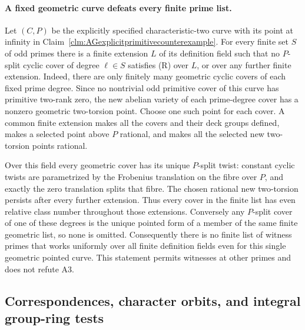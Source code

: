 \documentclass[11pt]{article}
\begin{document}
\paragraph{A fixed geometric curve defeats every finite prime list.}
Let $(C,P)$ be the explicitly specified characteristic-two
curve with its point at infinity in
Claim~\ref{clm:AGexplicitprimitivecounterexample}.
For every finite set $S$ of odd primes there is a finite
extension $L$ of its definition field such that no
$P$-split cyclic cover of degree $\ell\in S$ satisfies
(R) over $L$, or over any further finite extension.
Indeed, there are only finitely many geometric cyclic
covers of each fixed prime degree. Since no nontrivial
odd primitive cover of this curve has primitive two-rank
zero, the new abelian variety of each prime-degree cover
has a nonzero geometric two-torsion point. Choose one
such point for each cover. A common finite extension
makes all the covers and their deck groups defined,
makes a selected point above $P$ rational, and makes
all the selected new two-torsion points rational.

Over this field every geometric cover has its unique
$P$-split twist: constant cyclic twists are parametrized
by the Frobenius translation on the fibre over $P$, and
exactly the zero translation splits that fibre.
The chosen rational new two-torsion persists after every
further extension. Thus every cover in the finite list
has even relative class number throughout those
extensions. Conversely any $P$-split cover of one of
these degrees is the unique pointed form of a member
of the same finite geometric list, so none is omitted.
Consequently there is no finite list of witness primes
that works uniformly over all finite definition fields
even for this single geometric pointed curve. This
statement permits witnesses at other primes and does
not refute A3.

\subsection{Correspondences, character orbits, and integral group-ring tests}
\end{document}
